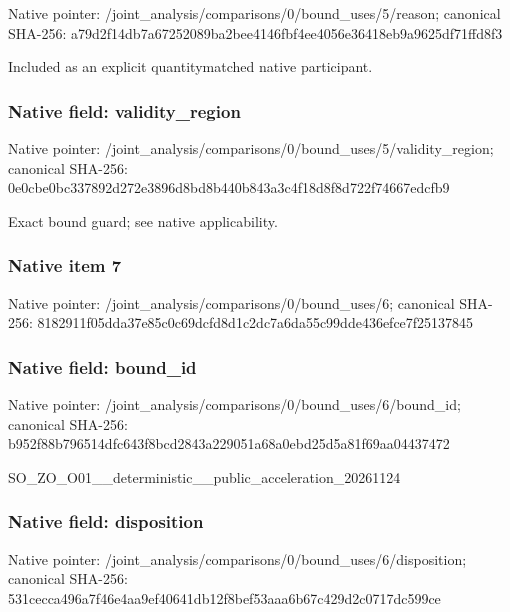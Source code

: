 \documentclass[10pt,a4paper]{article}
\begin{document}
Native pointer: /joint\_analysis/comparis\allowbreak{}ons/0/bound\_uses/5/reaso\allowbreak{}n; canonical SHA-256: a79d2f14db7a67252089ba2b\allowbreak{}ee4146fbf4ee4056e36418eb\allowbreak{}9a9625df71ffd8f3


Included as an explicit quantitymatched native participant.


\subsubsection{Native field: validity\_region}


Native pointer: /joint\_analysis/comparis\allowbreak{}ons/0/bound\_uses/5/valid\allowbreak{}ity\_region; canonical SHA-256: 0e0cbe0bc337892d272e3896\allowbreak{}d8bd8b440b843a3c4f18d8f8\allowbreak{}d722f74667edcfb9


Exact bound guard; see native applicability.


\subsubsection{Native item 7}


Native pointer: /joint\_analysis/comparis\allowbreak{}ons/0/bound\_uses/6; canonical SHA-256: 8182911f05dda37e85c0c69d\allowbreak{}cfd8d1c2dc7a6da55c99dde4\allowbreak{}36efce7f25137845



\subsubsection{Native field: bound\_id}


Native pointer: /joint\_analysis/comparis\allowbreak{}ons/0/bound\_uses/6/bound\allowbreak{}\_id; canonical SHA-256: b952f88b796514dfc643f8bc\allowbreak{}d2843a229051a68a0ebd25d5\allowbreak{}a81f69aa04437472


SO\_ZO\_O01\_\_deterministic\allowbreak{}\_\_public\_acceleration\_20\allowbreak{}261124


\subsubsection{Native field: disposition}


Native pointer: /joint\_analysis/comparis\allowbreak{}ons/0/bound\_uses/6/dispo\allowbreak{}sition; canonical SHA-256: 531cecca496a7f46e4aa9ef4\allowbreak{}0641db12f8bef53aaa6b67c4\allowbreak{}29d2c0717dc599ce
\end{document}
